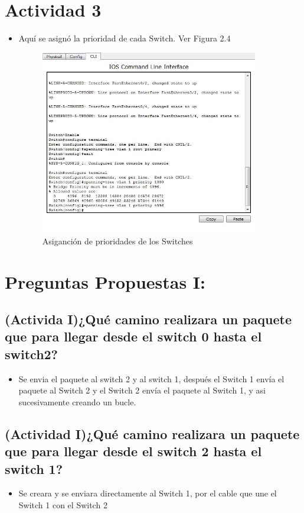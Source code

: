 \documentclass[spanish]{udpreport}
\begin{document}
\section{Actividad 3}
\begin{itemize}
\item Aquí se asignó la prioridad de cada Switch. Ver Figura 2.4 \\

\begin{figure}[h!]
	\centering
	\includegraphics[width=0.90\textwidth]{./imagenes/redes4}
	\caption{Asiganción de prioridades de los Switches} 
\end{figure}


\end{itemize}
\vspace{8 cm}
\section{Preguntas Propuestas I:}
\subsection{(Activida I)¿Qué camino realizara un paquete que para llegar desde el switch
0 hasta el switch2?}
\begin{itemize}
\smallskip
\item Se envia el paquete al switch 2 y al switch 1, después el Switch 1 envía el paquete al Switch 2 y el Switch 2 envía el paquete al Switch 1, y asi sucesivamente creando un bucle.
\end{itemize}
\subsection{(Actividad I)¿Qué camino realizara un paquete que para llegar desde el switch
2 hasta el switch 1?}
\begin{itemize}
\item Se creara y se enviara directamente al Switch 1, por el cable que une el Switch 1 con el Switch 2
\end{itemize}
\end{document}
